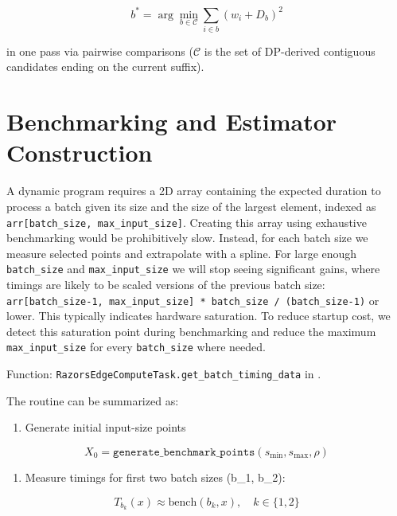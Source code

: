 \documentclass{article}
\providecommand{\tightlist}{\setlength{\itemsep}{0pt}\setlength{\parskip}{0pt}}
\begin{document}
\[
b^*=\arg\min_{b \in \mathcal{C}} \sum_{i\in b}(w_i + D_b)^2
\]

in one pass via pairwise comparisons
(\(\mathcal{C}\) is the set of DP-derived contiguous candidates ending
on the current suffix).

\hypertarget{5-benchmarking-and-estimator-construction}{%
\section{Benchmarking and Estimator
Construction}\label{5-benchmarking-and-estimator-construction}}

A dynamic program requires a 2D array containing the expected duration
to process a batch given its size and the size of the largest element,
indexed as \texttt{arr{[}batch\_size,\ max\_input\_size{]}}. Creating
this array using exhaustive benchmarking would be prohibitively slow.
Instead, for each batch size we measure selected points and extrapolate
with a spline. For large enough \texttt{batch\_size} and
\texttt{max\_input\_size} we will stop seeing significant gains, where
timings are likely to be scaled versions of the previous batch size:
\texttt{arr{[}batch\_size-1,\ max\_input\_size{]}\ *\ batch\_size\ /\ (batch\_size-1)}
or lower. This typically indicates hardware saturation. To reduce
startup cost, we detect this saturation point during benchmarking and
reduce the maximum \texttt{max\_input\_size} for every
\texttt{batch\_size} where needed.

Function: \texttt{RazorsEdgeComputeTask.get\_batch\_timing\_data} in
.

The routine can be summarized as:

\begin{enumerate}
\def\labelenumi{\arabic{enumi}.}
\tightlist
\item
  Generate initial input-size points
\end{enumerate}

\[
X_0=\texttt{generate\_benchmark\_points}(s_{\min}, s_{\max}, \rho)
\]

\begin{enumerate}
\def\labelenumi{\arabic{enumi}.}
\setcounter{enumi}{1}
\tightlist
\item
  Measure timings for first two batch sizes (b\_1, b\_2):
\end{enumerate}

\[
T_{b_k}(x)\approx \text{bench}(b_k,x),\quad k\in\{1,2\}
\]
\end{document}
